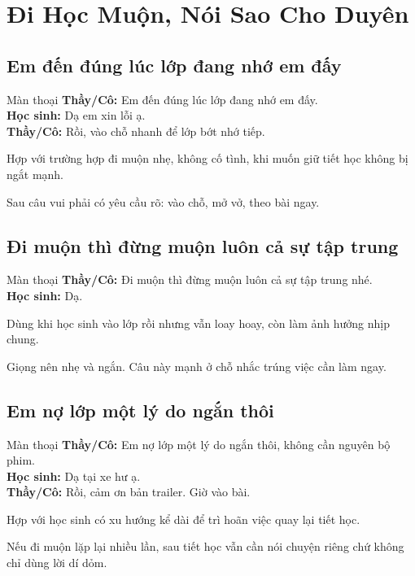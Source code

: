 \chapter{Đi Học Muộn, Nói Sao Cho Duyên}

\section{Em đến đúng lúc lớp đang nhớ em đấy}
\begin{manthoai}{Màn thoại}
\textbf{Thầy/Cô:} Em đến đúng lúc lớp đang nhớ em đấy.\\
\textbf{Học sinh:} Dạ em xin lỗi ạ.\\
\textbf{Thầy/Cô:} Rồi, vào chỗ nhanh để lớp bớt nhớ tiếp.
\end{manthoai}
\begin{dungkhinào}
Hợp với trường hợp đi muộn nhẹ, không cố tình, khi muốn giữ tiết học không bị ngắt mạnh.
\end{dungkhinào}
\begin{nhipthem}
Sau câu vui phải có yêu cầu rõ: vào chỗ, mở vở, theo bài ngay.
\end{nhipthem}
\ngancach

\section{Đi muộn thì đừng muộn luôn cả sự tập trung}
\begin{manthoai}{Màn thoại}
\textbf{Thầy/Cô:} Đi muộn thì đừng muộn luôn cả sự tập trung nhé.\\
\textbf{Học sinh:} Dạ.
\end{manthoai}
\begin{dungkhinào}
Dùng khi học sinh vào lớp rồi nhưng vẫn loay hoay, còn làm ảnh hưởng nhịp chung.
\end{dungkhinào}
\begin{nhipthem}
Giọng nên nhẹ và ngắn. Câu này mạnh ở chỗ nhắc trúng việc cần làm ngay.
\end{nhipthem}
\ngancach

\section{Em nợ lớp một lý do ngắn thôi}
\begin{manthoai}{Màn thoại}
\textbf{Thầy/Cô:} Em nợ lớp một lý do ngắn thôi, không cần nguyên bộ phim.\\
\textbf{Học sinh:} Dạ tại xe hư ạ.\\
\textbf{Thầy/Cô:} Rồi, cảm ơn bản trailer. Giờ vào bài.
\end{manthoai}
\begin{dungkhinào}
Hợp với học sinh có xu hướng kể dài để trì hoãn việc quay lại tiết học.
\end{dungkhinào}
\begin{nhipthem}
Nếu đi muộn lặp lại nhiều lần, sau tiết học vẫn cần nói chuyện riêng chứ không chỉ dùng lời dí dỏm.
\end{nhipthem}
\ngancach

